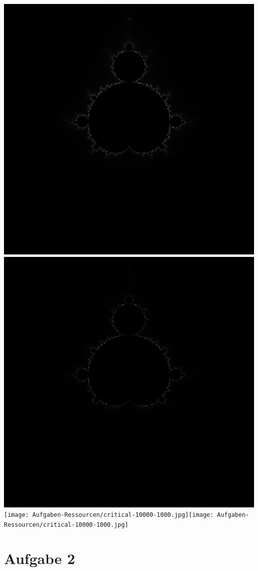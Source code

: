 \documentclass{article}
\begin{document}
	\begin{center}
		\includegraphics[width=0.4\linewidth]{Aufgaben-Ressourcen/critical-1000.jpg}\quad\includegraphics[width=0.4\linewidth]{Aufgaben-Ressourcen/critical-1000-1000.jpg}
		\\[\baselineskip]
		\texttt{[image: Aufgaben-Ressourcen/critical-10000-1000.jpg]}\quad\texttt{[image: Aufgaben-Ressourcen/critical-10000-1000.jpg]}
	\end{center}


    \section{Aufgabe 2}
\end{document}
